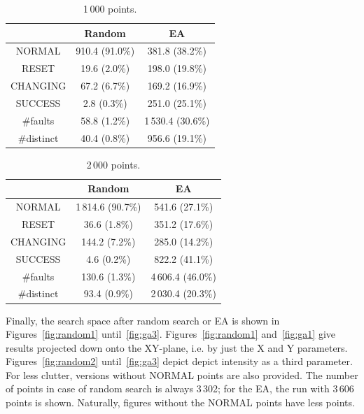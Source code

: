\documentclass[times, utf8, diplomski]{fer}
\begin{document}
\begin{table}
	\small
	\caption{1\,000 points.}
	\label{tab:1000}
	\centering
	\begin{tabular}{ccc}
		           &     Random     &        EA         \\ \toprule
		  NORMAL   & 910.4 (91.0\%) &  381.8 (38.2\%)   \\
		  RESET    &  19.6 (2.0\%)  &  198.0 (19.8\%)   \\
		 CHANGING  &  67.2 (6.7\%)  &  169.2 (16.9\%)   \\
		 SUCCESS   &  2.8 (0.3\%)   &  251.0 (25.1\%)   \\ \midrule
		 \#faults  &  58.8 (1.2\%)  & 1\,530.4 (30.6\%) \\
		\#distinct &  40.4 (0.8\%)  &  956.6 (19.1\%)   \\ \bottomrule
	\end{tabular}
\end{table}

\begin{table}
	\small
	\caption{2\,000 points.}
	\label{tab:2000}
	\centering
	\begin{tabular}{ccc}
		           &      Random       &        EA         \\ \toprule
		  NORMAL   & 1\,814.6 (90.7\%) &  541.6 (27.1\%)   \\
		  RESET    &   36.6 (1.8\%)    &  351.2 (17.6\%)   \\
		 CHANGING  &   144.2 (7.2\%)   &  285.0 (14.2\%)   \\
		 SUCCESS   &    4.6 (0.2\%)    &  822.2 (41.1\%)   \\ \midrule
		 \#faults  &   130.6 (1.3\%)   & 4\,606.4 (46.0\%) \\
		\#distinct &   93.4 (0.9\%)    & 2\,030.4 (20.3\%) \\ \bottomrule
	\end{tabular}
\end{table}


Finally, the search space after random search or EA is shown in Figures~\ref{fig:random1}
until~\ref{fig:ga3}. Figures~\ref{fig:random1} and~\ref{fig:ga1} give results
projected down onto the XY-plane, i.e. by just the X and Y parameters. Figures~\ref{fig:random2}
until~\ref{fig:ga3} depict depict intensity as a third parameter. For less clutter,
versions without NORMAL points are also provided. The number of points in case
of random search is always 3\,302; for the EA, the run with 3\,606 points is shown.
Naturally, figures without the NORMAL points have less points.
\end{document}
